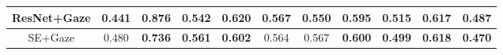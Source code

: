\begin{table*}[h]
\begin{tabular}{ccccccccccc}
ResNet+Gaze    & 0.441                           & 0.876                           & 0.542                           & 0.620                           & \textbf{0.567} & \textbf{0.550} & 0.595                           & 0.515                           & 0.617                           & 0.487                           \\ \hline
SE+Gaze        & 0.480                           & \textbf{0.736} & \textbf{0.561} & \textbf{0.602} & 0.564                           & 0.567                           & \textbf{0.600} & \textbf{0.499} & \textbf{0.618} & \textbf{0.470} \\ \hline

\end{tabular}
\end{table*}